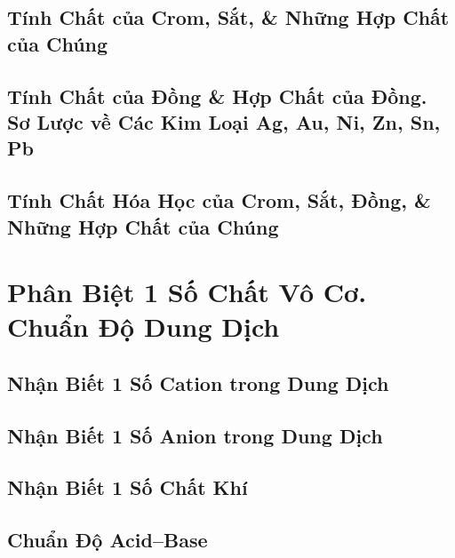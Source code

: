 \documentclass{article}
\numberwithin{equation}{section}
\begin{document}
\subsection{Tính Chất của Crom, Sắt, \& Những Hợp Chất của Chúng}


\subsection{Tính Chất của Đồng \& Hợp Chất của Đồng. Sơ Lược về Các Kim Loại Ag, Au, Ni, Zn, Sn, Pb}


\subsection{Tính Chất Hóa Học của Crom, Sắt, Đồng, \& Những Hợp Chất của Chúng}


\section{Phân Biệt 1 Số Chất Vô Cơ. Chuẩn Độ Dung Dịch}

\subsection{Nhận Biết 1 Số Cation trong Dung Dịch}


\subsection{Nhận Biết 1 Số Anion trong Dung Dịch}


\subsection{Nhận Biết 1 Số Chất Khí}


\subsection{Chuẩn Độ Acid--Base}
\end{document}

